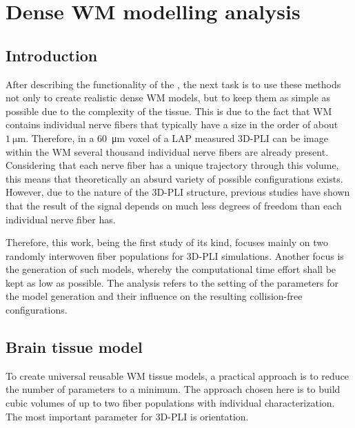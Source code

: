 \setcounter{chapter}{6}
\chapter{Dense \acs{WM} modelling analysis}
\label{cha:model_analysis}
% 
% 
% 
\section{Introduction}
% 
After describing the functionality of the , the next task is to use these methods not only to create realistic dense \ac{WM} models, but to keep them as simple as possible due to the complexity of the tissue.
This is due to the fact that \ac{WM} contains individual nerve fibers that typically have a size in the order of about $\SI{1}{\micro\meter}$.
Therefore, in a \SI{60}{\micro\meter} voxel of a \ac{LAP} measured \ac{3D-PLI} can be image within the \ac{WM} several thousand individual nerve fibers are already present.
Considering that each nerve fiber has a unique trajectory through this volume, this means that theoretically an absurd variety of possible configurations exists.
However, due to the nature of the \ac{3D-PLI} structure, previous studies have shown that the result of the signal depends on much less degrees of freedom than each individual nerve fiber has.
\par
% 
Therefore, this work, being the first study of its kind, focuses mainly on two randomly interwoven fiber populations for \ac{3D-PLI} simulations.
Another focus is the generation of such models, whereby the computational time effort shall be kept as low as possible.
The analysis refers to the setting of the parameters for the model generation and their influence on the resulting collision-free configurations.
% 
% 
\section{Brain tissue model}
% 
To create universal reusable \ac{WM} tissue models, a practical approach is to reduce the number of parameters to a minimum.
The approach chosen here is to build cubic volumes of up to two fiber populations with individual characterization.
The most important parameter for \ac{3D-PLI} is orientation.
% 
